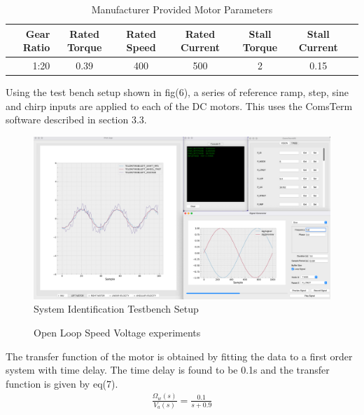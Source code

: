         \begin{table}[H]
            \centering
                \begin{tabular}{|r|c|c|c|c|c|c|}
                    \hline 
                    Gear Ratio & Rated Torque & Rated Speed & Rated Current & Stall Torque & Stall Current \\
                    \hline
                     1:20 & 0.39 & 400 & 500 & 2 & 0.15 \\
                    \hline
                \end{tabular}
                \caption{Manufacturer Provided Motor Parameters}
        \end{table}
        Using the test bench setup shown in fig(6), a series of reference ramp, step, 
        sine and chirp inputs are applied to each of the DC motors.  This uses the ComsTerm software described in section 3.3.
        \begin{figure}[H]
            \centering
            \includegraphics[height=0.45\textwidth]{SysIDMotorSetUp.png}
            \caption{System Identification Testbench Setup}
        \end{figure}
     

        \begin{figure}[H]
            \centering
            \caption{Open Loop Speed Voltage experiments}
        \end{figure}    
        The transfer function of the motor is obtained by fitting the data to a first order system with time delay.
        The time delay is found to be 0.1s and the transfer function is given by eq(7).
        \begin{equation}
            \begin{aligned}
                \frac{\Omega_w \left(s\right)}{V_a \left(s\right)}=\frac{0.1}{s+0.9}
            \end{aligned}
        \end{equation}


